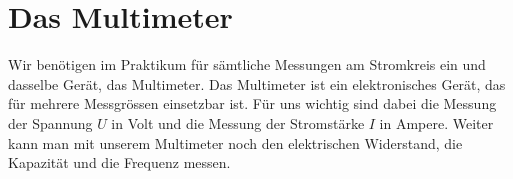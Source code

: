 \documentclass[11pt,twoside=false,open=any]{scrbook}
\begin{document}

\chapter{Das Multimeter}
Wir benötigen im Praktikum für sämtliche Messungen am Stromkreis ein und dasselbe Gerät, das Multimeter. Das Multimeter ist ein elektronisches Gerät, das für mehrere Messgrössen einsetzbar ist. Für uns wichtig sind dabei die Messung der Spannung $U$ in Volt und die Messung der Stromstärke $I$ in Ampere. Weiter kann man mit unserem Multimeter noch den elektrischen Widerstand, die Kapazität und die Frequenz messen. 

\begin{figure}[h]
\centering
{}
\end{figure}
\end{document}
